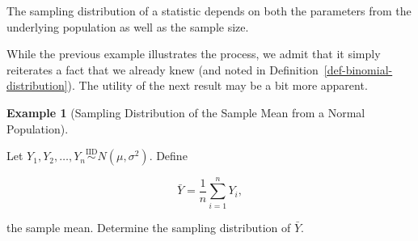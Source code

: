 \documentclass[
  letterpaper,
  DIV=11,
  numbers=noendperiod]{scrreprt}
\theoremstyle{definition}
\theoremstyle{plain}
\theoremstyle{definition}
\newtheorem{example}{Example}[chapter]
\theoremstyle{remark}
\begin{document}
\begin{tcolorbox}[enhanced jigsaw, rightrule=.15mm, leftrule=.75mm, opacityback=0, coltitle=black, bottomrule=.15mm, opacitybacktitle=0.6, left=2mm, colframe=quarto-callout-tip-color-frame, breakable, colback=white, arc=.35mm, toprule=.15mm, toptitle=1mm, bottomtitle=1mm, title=\textcolor{quarto-callout-tip-color}{\faLightbulb}\hspace{0.5em}{Big Idea}, titlerule=0mm, colbacktitle=quarto-callout-tip-color!10!white]

The sampling distribution of a statistic depends on both the parameters
from the underlying population as well as the sample size.

\end{tcolorbox}

While the previous example illustrates the process, we admit that it
simply reiterates a fact that we already knew (and noted in
Definition~\ref{def-binomial-distribution}). The utility of the next
result may be a bit more apparent.

\begin{example}[Sampling Distribution of the Sample Mean from a Normal
Population]\protect\hypertarget{exm-normal-mean}{}\label{exm-normal-mean}

Let
\(Y_1, Y_2, \dotsc, Y_n \stackrel{\text{IID}}{\sim} N\left(\mu,\sigma^2\right)\).
Define

\[\bar{Y} = \frac{1}{n}\sum_{i=1}^{n} Y_i,\]

the sample mean. Determine the sampling distribution of \(\bar{Y}\).

\end{example}
\end{document}
